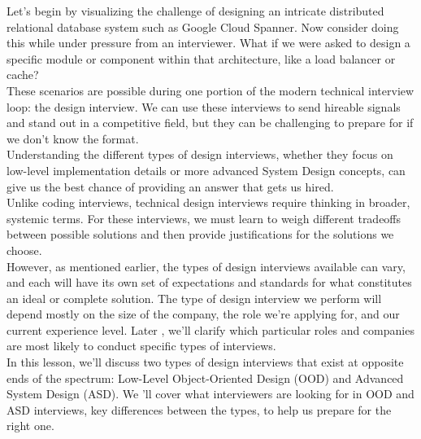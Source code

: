 

Let's begin by visualizing the challenge of designing an intricate distributed relational database system such as Google Cloud Spanner. Now consider doing this while under pressure from an interviewer. What if we were asked to design a specific module or component within that architecture, like a load balancer or cache?
\\
These scenarios are possible during one portion of the modern technical interview loop: the design interview. We can use these interviews to send hireable signals and stand out in a competitive field, but they can be challenging to prepare for if we don't know the format.
\\
Understanding the different types of design interviews, whether they focus on low-level implementation details or more advanced System Design concepts, can give us the best chance of providing an answer that gets us hired.
\\
Unlike coding interviews, technical design interviews require thinking in broader, systemic terms. For these interviews, we must learn to weigh different tradeoffs between possible solutions and then provide justifications for the solutions we choose.
\\
However, as mentioned earlier, the types of design interviews available can vary, and each will have its own set of expectations and standards for what constitutes an ideal or complete solution. The type of design interview we perform will depend mostly on the size of the company, the role we're applying for, and our current experience level. Later , we'll clarify which particular roles and companies are most likely to conduct specific types of interviews.
\\
In this lesson, we'll discuss two types of design interviews that exist at opposite ends of the spectrum: Low-Level Object-Oriented Design (OOD) and Advanced System Design (ASD). We 'll cover what interviewers are looking for in OOD and ASD interviews, key differences between the types, to help us prepare for the right one.

